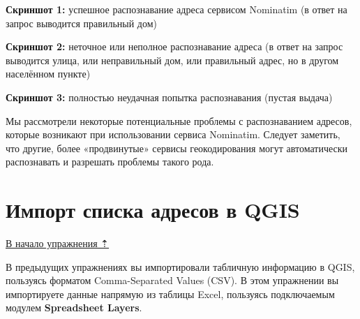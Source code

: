 \documentclass[
  12pt,
]{book}
\begin{document}
\textbf{Скриншот 1:} успешное распознавание адреса сервисом Nominatim (в ответ на запрос выводится правильный дом)

\textbf{Скриншот 2:} неточное или неполное распознавание адреса (в ответ на запрос выводится улица, или неправильный дом, или правильный адрес, но в другом населённом пункте)

\textbf{Скриншот 3:} полностью неудачная попытка распознавания (пустая выдача)

Мы рассмотрели некоторые потенциальные проблемы с распознаванием адресов, которые возникают при использовании сервиса Nominatim. Следует заметить, что другие, более «продвинутые» сервисы геокодирования могут автоматически распознавать и разрешать проблемы такого рода.

\hypertarget{geocoding-import}{%
\section{Импорт списка адресов в QGIS}\label{geocoding-import}}

\protect\hyperlink{geocoding}{В начало упражнения ⇡}

В предыдущих упражнениях вы импортировали табличную информацию в QGIS, пользуясь форматом Comma-Separated Values (CSV). В этом упражнении вы импортируете данные напрямую из таблицы Excel, пользуясь подключаемым модулем \textbf{Spreadsheet Layers}.
\end{document}
